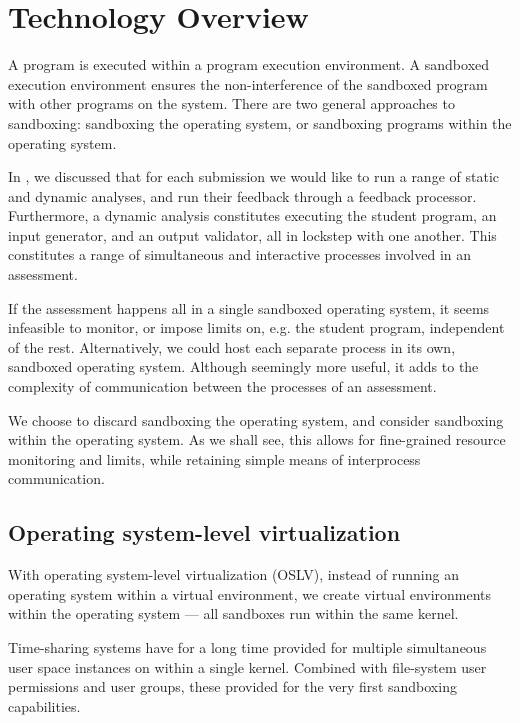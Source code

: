 
\section{Technology Overview}

A program is executed within a program execution environment. A sandboxed
execution environment ensures the non-interference of the sandboxed program
with other programs on the system. There are two general approaches to
sandboxing: sandboxing the operating system, or sandboxing programs within the
operating system.

In , we discussed that for each submission we would
like to run a range of static and dynamic analyses, and run their feedback
through a feedback processor. Furthermore, a dynamic analysis constitutes
executing the student program, an input generator, and an output validator, all
in lockstep with one another. This constitutes a range of simultaneous and
interactive processes involved in an assessment.

If the assessment happens all in a single sandboxed operating system, it seems
infeasible to monitor, or impose limits on, e.g. the student program,
independent of the rest. Alternatively, we could host each separate process in
its own, sandboxed operating system. Although seemingly more useful, it adds to
the complexity of communication between the processes of an assessment.

We choose to discard sandboxing the operating system, and consider sandboxing
within the operating system. As we shall see, this allows for fine-grained
resource monitoring and limits, while retaining simple means of interprocess
communication.

\subsection{Operating system-level virtualization}

With operating system-level virtualization (OSLV), instead of running an
operating system within a virtual environment, we create virtual environments
within the operating system --- all sandboxes run within the same kernel.

Time-sharing systems have for a long time provided for multiple simultaneous
user space instances on within a single kernel. Combined with file-system user
permissions and user groups, these provided for the very first sandboxing
capabilities.

